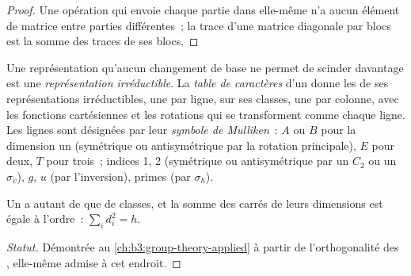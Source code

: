 \begin{proof}
Une opération qui envoie chaque partie dans elle-même n'a aucun élément
de matrice entre parties différentes~; la trace d'une matrice diagonale
par blocs est la somme des traces de ses blocs.
\end{proof}

\begin{definition}\label{def:b3:point-groups:irrep}
Une représentation qu'aucun changement de base ne permet de scinder
davantage est une
\emph{représentation irréductible}. La
\emph{table de caractères} d'un  donne
les  de ses représentations irréductibles, une par ligne, sur
ses classes, une par colonne, avec les fonctions cartésiennes et les
rotations qui se transforment comme chaque ligne. Les lignes sont
désignées par leur \emph{symbole de
Mulliken}~: $A$ ou $B$ pour la dimension un
(symétrique ou antisymétrique par la rotation principale), $E$ pour
deux, $T$ pour trois~; indices 1, 2 (symétrique ou antisymétrique par un
$C_2$ ou un $\sigma_v$), $g$, $u$
(par l'inversion), primes (par $\sigma_h$).
\end{definition}

\begin{proposition}\label{prop:b3:point-groups:irrep-count}
Un  a autant de  que de
classes, et la somme des carrés de leurs dimensions est égale à
l'ordre~: $\sum_id_i^2 = h$.
\end{proposition}
\begin{proof}[Statut]
Démontrée au \cref{ch:b3:group-theory-applied} à partir de l'orthogonalité
des , elle-même admise à cet endroit.
\end{proof}

